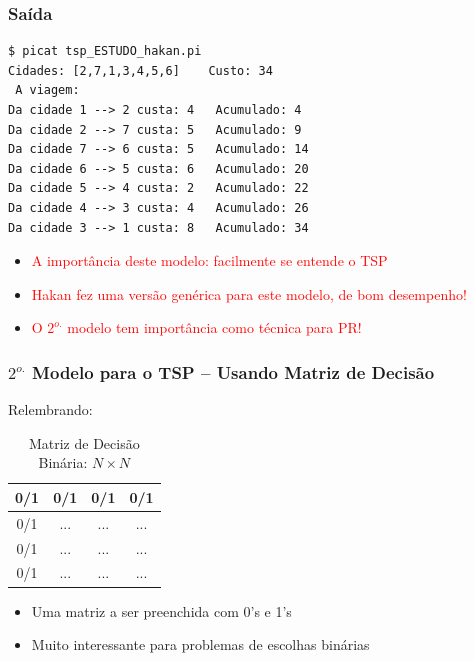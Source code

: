 \begin{frame}[fragile]
 \frametitle{Saída}

\begin{footnotesize}
\begin{verbatim}
$ picat tsp_ESTUDO_hakan.pi 
Cidades: [2,7,1,3,4,5,6]	Custo: 34
 A viagem: 
Da cidade 1 --> 2 custa: 4	 Acumulado: 4
Da cidade 2 --> 7 custa: 5	 Acumulado: 9
Da cidade 7 --> 6 custa: 5	 Acumulado: 14
Da cidade 6 --> 5 custa: 6	 Acumulado: 20
Da cidade 5 --> 4 custa: 2	 Acumulado: 22
Da cidade 4 --> 3 custa: 4	 Acumulado: 26
Da cidade 3 --> 1 custa: 8	 Acumulado: 34
\end{verbatim}
\end{footnotesize}
\pause

\begin{itemize}
  \item \textcolor{red}{A importância deste modelo: facilmente se entende o TSP}
  \pause
   \item \textcolor{red}{Hakan fez uma versão genérica para este modelo, de bom desempenho!}
  \pause
   \item \textcolor{red}{O $2^{o.}$ modelo tem importância como técnica para PR!}


\end{itemize}



\end{frame}

\begin{frame}[fragile]
\frametitle{$2^{o.}$ Modelo para o TSP -- Usando Matriz de Decisão}

Relembrando:
\begin{table}
\centering
\begin{tabular}{|c|c|c|c|}
\hline \hline
{\color[HTML]{00009B} 0/1} & {\color[HTML]{00009B} 0/1} & {\color[HTML]{00009B} 0/1} & {\color[HTML]{00009B} 0/1} \\ \hline
{\color[HTML]{00009B} 0/1} & ...                        & ...                        & ...                        \\ \hline
{\color[HTML]{00009B} 0/1} & ...                        & ...                        & ...                        \\ \hline
{\color[HTML]{00009B} 0/1} & ...                        & ...                        & ...                        \\ 
\hline \hline
\end{tabular}

\caption{Matriz de Decisão Binária: $N \times N$}
\end{table}

\begin{itemize}
  \item Uma matriz a ser preenchida com 0's e 1's
  \item Muito interessante para problemas de escolhas binárias
\end{itemize}


\end{frame}



